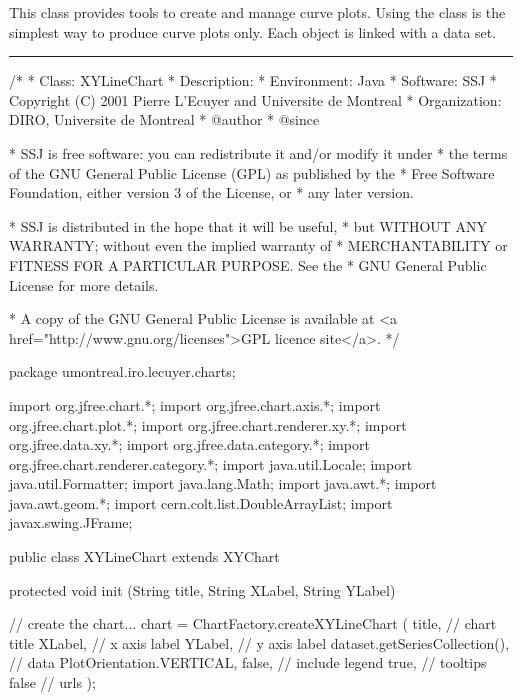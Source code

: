 
This class provides tools to create and manage curve plots. Using the
 class is the simplest way to produce curve plots only.
Each  object is linked with a
 data set.

\bigskip\hrule
\begin{code}
\begin{hide}
/*
 * Class:        XYLineChart
 * Description:  
 * Environment:  Java
 * Software:     SSJ 
 * Copyright (C) 2001  Pierre L'Ecuyer and Universite de Montreal
 * Organization: DIRO, Universite de Montreal
 * @author       
 * @since

 * SSJ is free software: you can redistribute it and/or modify it under
 * the terms of the GNU General Public License (GPL) as published by the
 * Free Software Foundation, either version 3 of the License, or
 * any later version.

 * SSJ is distributed in the hope that it will be useful,
 * but WITHOUT ANY WARRANTY; without even the implied warranty of
 * MERCHANTABILITY or FITNESS FOR A PARTICULAR PURPOSE.  See the
 * GNU General Public License for more details.

 * A copy of the GNU General Public License is available at
   <a href="http://www.gnu.org/licenses">GPL licence site</a>.
 */
\end{hide}
package umontreal.iro.lecuyer.charts;\begin{hide}

import   org.jfree.chart.*;
import   org.jfree.chart.axis.*;
import   org.jfree.chart.plot.*;
import   org.jfree.chart.renderer.xy.*;
import   org.jfree.data.xy.*;
import   org.jfree.data.category.*;
import   org.jfree.chart.renderer.category.*;
import   java.util.Locale;
import   java.util.Formatter;
import   java.lang.Math;
import   java.awt.*;
import   java.awt.geom.*;
import   cern.colt.list.DoubleArrayList;
import   javax.swing.JFrame;\end{hide}

public class XYLineChart extends XYChart \begin{hide} {

   protected void init (String title, String XLabel, String YLabel) {
      // create the chart...
      chart = ChartFactory.createXYLineChart (
         title,                    // chart title
         XLabel,                   // x axis label
         YLabel,                   // y axis label
         dataset.getSeriesCollection(), // data
         PlotOrientation.VERTICAL,
         false,                    // include legend
         true,                     // tooltips
         false                     // urls
      );

}}
\end{hide}
\end{code}
